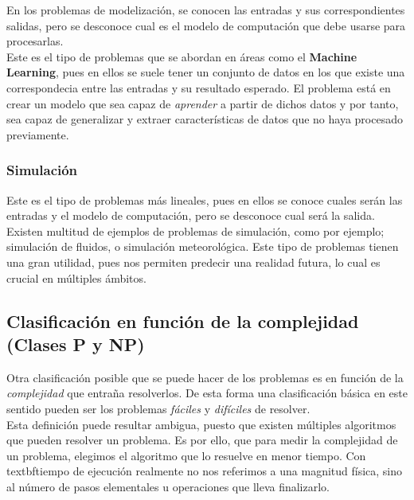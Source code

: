 En los problemas de modelización, se conocen las entradas y sus correspondientes salidas, pero se desconoce cual es el modelo de computación que debe usarse para procesarlas. \\


Este es el tipo de problemas que se abordan en áreas como el \textbf{Machine Learning}, pues en ellos se suele tener un conjunto de datos en los que existe una correspondecia entre las entradas y su resultado esperado. El problema está en crear un modelo que sea capaz de \textit{aprender} a partir de dichos datos y por tanto, sea capaz de generalizar y extraer características de datos que no haya procesado previamente.

\subsubsection{Simulación}

Este es el tipo de problemas más lineales, pues en ellos se conoce cuales serán las entradas y el modelo de computación, pero se desconoce cual será la salida. \\

Existen multitud de ejemplos de problemas de simulación, como por ejemplo; simulación de fluidos, o simulación meteorológica. Este tipo de problemas tienen una gran utilidad, pues nos permiten predecir una realidad futura, lo cual es crucial en múltiples ámbitos. \\


\subsection{Clasificación en función de la complejidad (Clases P y NP)}

Otra clasificación posible que se puede hacer de los problemas es en función de la \textit{complejidad} que entraña resolverlos. De esta forma una clasificación básica en este sentido pueden ser los problemas \textit{fáciles} y \textit{difíciles} de resolver.\\

Esta definición puede resultar ambigua, puesto que existen múltiples algoritmos que pueden resolver un problema. Es por ello, que para medir la complejidad de un problema, elegimos el algoritmo que lo resuelve en menor tiempo. Con \\textbf{tiempo de ejecución} realmente no nos referimos a una magnitud física, sino al número de pasos elementales u operaciones que lleva finalizarlo. \\

